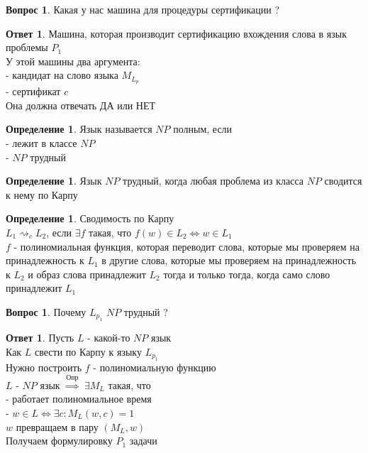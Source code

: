 \documentclass{beamer}
\theoremstyle{plain}
\theoremstyle{definition}
\newtheorem{dfn}[thm]{Определение}
\newtheorem{Q}[thm]{Вопрос}
\newtheorem{A}[thm]{Ответ}
\begin{document}
\begin{frame}
	\begin{Q}
	    Какая у нас машина для процедуры сертификации ?
	\end{Q}
	\begin{A}
	    Машина, которая производит сертификацию вхождения слова в язык проблемы $P_1$ \\
	    У этой машины два аргумента: \\
	        - кандидат на слово языка $M_{L_p}$ \\
	        - сертификат $c$ \\
	  	Она должна отвечать ДА или НЕТ
	\end{A}
\end{frame}

\begin{frame}
	\begin{dfn}
	    Язык называется $NP$ полным, если \\
	    - лежит в классе $NP$ \\
	    - $NP$ трудный	
	\end{dfn}

	\begin{dfn}
		Язык $NP$ трудный, когда любая проблема из класса $NP$ сводится к нему по Карпу
	\end{dfn}
	
	\begin{dfn}
	    Сводимость по Карпу \\
	    $L_1\rightsquigarrow_c L_2$, если $\exists f$ такая, что $f(w)\in L_2 \Leftrightarrow w \in L_1$ \\
	    $f$ - полиномиальная функция, которая переводит слова, которые мы проверяем на принадлежность к $L_1$ в другие слова, которые мы проверяем на принадлежность к $L_2$ и образ слова принадлежит $L_2$ тогда и только тогда, когда само слово принадлежит $L_1$ 
	\end{dfn}
\end{frame}

\begin{frame}
	\begin{Q}
	    Почему $L_{p_1}$ $NP$ трудный ?
	\end{Q}
	\begin{A}
	    Пусть $L$ - какой-то $NP$ язык \\
	    Как $L$ свести по Карпу к языку $L_{p_1}$ \\
	    Нужно построить $f$ - полиномиальную функцию \\
	    $L$ - $NP$ язык ${\overset{\mbox{Опр}}\Rightarrow}$ $\exists M_L$ такая, что \\
	    - работает полиномиальное время \\
	    - $w \in L \Leftrightarrow \exists c : M_L(w,c)=1$ \\
	    $w$ превращаем в пару $(M_L, w)$ \\
	    Получаем формулировку $P_1$ задачи \\
	\end{A}
\end{frame}
\end{document}
